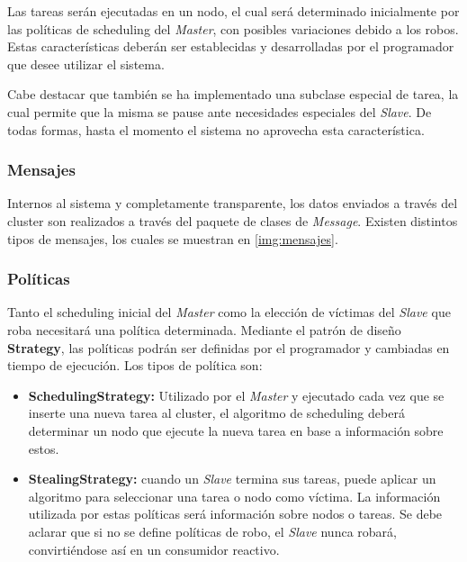 \documentclass[12pt,a4paper,oneside,spanish]{report}
\begin{document}

Las tareas serán ejecutadas en un nodo, el cual será determinado inicialmente por las políticas de scheduling del \textit{Master}, con posibles variaciones debido a los robos. Estas características deberán ser establecidas y desarrolladas por el programador que desee utilizar el sistema.

Cabe destacar que también se ha implementado una subclase especial de tarea, la cual permite que la misma se pause ante necesidades especiales del \textit{Slave}. De todas formas, hasta el momento el sistema no aprovecha esta característica.

\subsubsection*{Mensajes}

Internos al sistema y completamente transparente, los datos enviados a través del cluster son realizados a través del paquete de clases de \textit{Message}. Existen distintos tipos de mensajes, los cuales se muestran en \ref{img:mensajes}.

\subsubsection*{Políticas}

Tanto el scheduling inicial del \textit{Master} como la elección de víctimas del \textit{Slave} que roba necesitará una política determinada. Mediante el patrón de diseño \textbf{Strategy}, las políticas podrán ser definidas por el programador y cambiadas en tiempo de ejecución. Los tipos de política son:

\begin{itemize}
	\item \textbf{SchedulingStrategy:} Utilizado por el \textit{Master} y ejecutado cada vez que se inserte una nueva tarea al cluster, el algoritmo de scheduling deberá determinar un nodo que ejecute la nueva tarea en base a información sobre estos.
	\item \textbf{StealingStrategy:} cuando un \textit{Slave} termina sus tareas, puede aplicar un algoritmo para seleccionar una tarea o nodo como víctima. La información utilizada por estas políticas será información sobre nodos o tareas. 
Se debe aclarar que si no se define políticas de robo, el \textit{Slave} nunca robará, convirtiéndose así en un consumidor reactivo.
\end{itemize}
\end{document}
